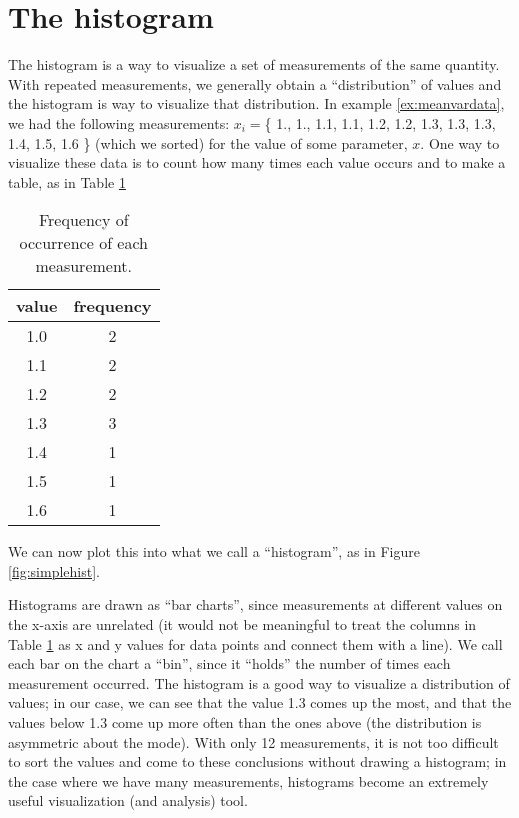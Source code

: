\section{The histogram}
The histogram is a way to visualize a set of measurements of the same quantity. With repeated measurements, we generally obtain a ``distribution'' of values and the histogram is  way to visualize that distribution. In example \ref{ex:meanvardata}, we had the following measurements: $x_i=$\{ 1., 1., 1.1, 1.1, 1.2, 1.2, 1.3, 1.3, 1.3, 1.4, 1.5, 1.6 \} (which we sorted) for the value of some parameter, $x$. One way to visualize these data is to count how many times each value occurs and to make a table, as in Table \ref{tab:measfreq}
\begin{table}[!ht]
\center
\begin{tabular}{|c|c|}
\hline
value & frequency\\
\hline
1.0 &2\\
\hline
1.1 &2\\
\hline
1.2 &2\\
\hline
1.3 &3\\
\hline
1.4 &1\\
\hline
1.5 &1\\
\hline
1.6 &1\\
\hline
\end{tabular}
\caption{\label{tab:measfreq}Frequency of occurrence of each measurement.}
\end{table}
We can now plot this into what we call a ``histogram'', as in Figure \ref{fig:simplehist}.

Histograms are drawn as ``bar charts'', since measurements at different values on the x-axis are unrelated (it would not be meaningful to treat the columns in Table \ref{tab:measfreq} as x and y values for data points and connect them with a line). We call each bar on the chart a ``bin'', since it ``holds'' the number of times each measurement occurred. The histogram is a good way to visualize a distribution of values; in our case, we can see that the value 1.3 comes up the most, and that the values below 1.3 come up more often than the ones above (the distribution is asymmetric about the mode). With only 12 measurements, it is not too difficult to sort the values and come to these conclusions without drawing a histogram; in the case where we have many measurements, histograms become an extremely useful visualization (and analysis) tool.

